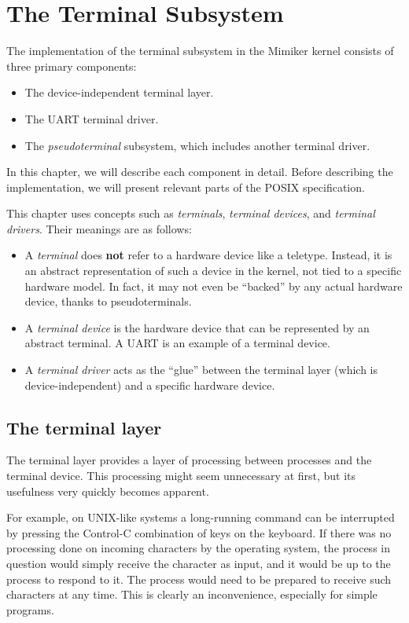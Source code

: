 \documentclass[shortabstract, manyadvisors, english, mgr]{iithesis}
\begin{document}
\chapter{The Terminal Subsystem}

The implementation of the terminal subsystem in the Mimiker kernel consists of
three primary components:
\begin{itemize}
\item The device-independent terminal layer.
\item The UART terminal driver.
\item The \textit{pseudoterminal} subsystem, which includes another terminal
  driver.
\end{itemize}

In this chapter, we will describe each component in detail. Before describing
the implementation, we will present relevant parts of the POSIX specification.

This chapter uses concepts such as \textit{terminals}, \textit{terminal
  devices}, and \textit{terminal drivers}. Their meanings are as follows:
\begin{itemize}
\item A \textit{terminal} does \textbf{not} refer to a hardware device like a
  teletype. Instead, it is an abstract representation of such a device in the
  kernel, not tied to a specific hardware model. In fact, it may not even be
  ``backed'' by any actual hardware device, thanks to pseudoterminals.
\item A \textit{terminal device} is the hardware device that can be represented
  by an abstract terminal. A UART is an example of a terminal device.
\item A \textit{terminal driver} acts as the ``glue'' between the terminal layer
  (which is device-independent) and a specific hardware device.
\end{itemize}

\section{The terminal layer}

The terminal layer provides a layer of processing between processes and the
terminal device. This processing might seem unnecessary at first, but its
usefulness very quickly becomes apparent.

For example, on UNIX-like systems a long-running command can be interrupted by
pressing the Control-C combination of keys on the keyboard. If there was no
processing done on incoming characters by the operating system, the process in
question would simply receive the character as input, and it would be up to the
process to respond to it. The process would need to be prepared to receive such
characters at any time. This is clearly an inconvenience, especially for simple
programs.
\end{document}
